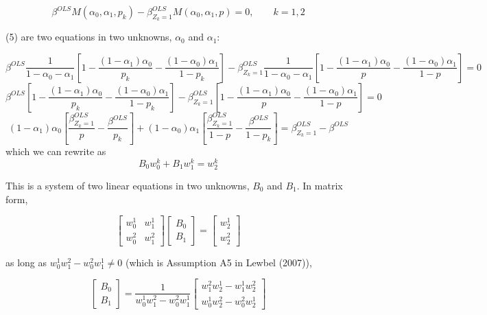 \begin{equation}
\beta^{OLS}M(\alpha_{0},\alpha_{1},p_{k})-\beta_{Z_{k}=1}^{OLS}M(\alpha_{0},\alpha_{1},p)=0,\qquad k=1,2
\end{equation}


(5) are two equations in two unknowns, $\alpha_{0}$ and $\alpha_{1}$:

\[
\beta^{OLS}\frac{1}{1-\alpha_{0}-\alpha_{1}}\left[1-\frac{(1-\alpha_{1})\alpha_{0}}{p_{k}}-\frac{(1-\alpha_{0})\alpha_{1}}{1-p_{k}}\right]-\beta_{Z_{k}=1}^{OLS}\frac{1}{1-\alpha_{0}-\alpha_{1}}\left[1-\frac{(1-\alpha_{1})\alpha_{0}}{p}-\frac{(1-\alpha_{0})\alpha_{1}}{1-p}\right]=0
\]
\[
\beta^{OLS}\left[1-\frac{(1-\alpha_{1})\alpha_{0}}{p_{k}}-\frac{(1-\alpha_{0})\alpha_{1}}{1-p_{k}}\right]-\beta_{Z_{k}=1}^{OLS}\left[1-\frac{(1-\alpha_{1})\alpha_{0}}{p}-\frac{(1-\alpha_{0})\alpha_{1}}{1-p}\right]=0
\]
\[
(1-\alpha_{1})\alpha_{0}\left[\frac{\beta_{Z_{k}=1}^{OLS}}{p}-\frac{\beta^{OLS}}{p_{k}}\right]+(1-\alpha_{0})\alpha_{1}\left[\frac{\beta_{Z_{k}=1}^{OLS}}{1-p}-\frac{\beta^{OLS}}{1-p_{k}}\right]=\beta_{Z_{k}=1}^{OLS}-\beta^{OLS}
\]
which we can rewrite as 
\[
B_{0}w_{0}^{k}+B_{1}w_{1}^{k}=w_{2}^{k}
\]


This is a system of two linear equations in two unknowns, $B_{0}$
and $B_{1}$. In matrix form,

\[
\left[\begin{array}{cc}
w_{0}^{1} & w{}_{1}^{1}\\
w_{0}^{2} & w_{1}^{2}
\end{array}\right]\left[\begin{array}{c}
B_{0}\\
B_{1}
\end{array}\right]=\left[\begin{array}{c}
w_{2}^{1}\\
w_{2}^{2}
\end{array}\right]
\]


as long as $w_{0}^{1}w_{1}^{2}-w_{0}^{2}w_{1}^{1}\neq0$ (which is
Assumption A5 in Lewbel (2007)),

\[
\left[\begin{array}{c}
B_{0}\\
B_{1}
\end{array}\right]=\frac{1}{w_{0}^{1}w_{1}^{2}-w_{0}^{2}w_{1}^{1}}\left[\begin{array}{c}
w_{1}^{2}w_{2}^{1}-w_{1}^{1}w_{2}^{2}\\
w_{0}^{1}w_{2}^{2}-w_{0}^{2}w_{2}^{1}
\end{array}\right]
\]


